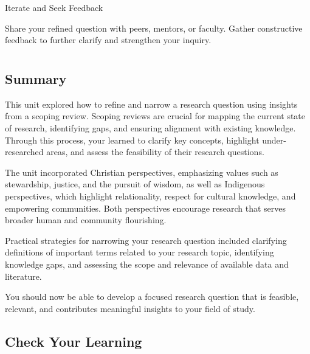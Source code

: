 \documentclass[
  letterpaper,
  DIV=11,
  numbers=noendperiod]{scrreprt}
\begin{document}
Iterate and Seek Feedback

Share your refined question with peers, mentors, or faculty. Gather
constructive feedback to further clarify and strengthen your inquiry.


\chapter*{}\label{section-8}

\markboth{}{}

\section*{Summary}\label{summary-4}


This unit explored how to refine and narrow a research question using
insights from a scoping review. Scoping reviews are crucial for mapping
the current state of research, identifying gaps, and ensuring alignment
with existing knowledge. Through this process, your learned to clarify
key concepts, highlight under-researched areas, and assess the
feasibility of their research questions.

The unit incorporated Christian perspectives, emphasizing values such as
stewardship, justice, and the pursuit of wisdom, as well as Indigenous
perspectives, which highlight relationality, respect for cultural
knowledge, and empowering communities. Both perspectives encourage
research that serves broader human and community flourishing.

Practical strategies for narrowing your research question included
clarifying definitions of important terms related to your research
topic, identifying knowledge gaps, and assessing the scope and relevance
of available data and literature.

You should now be able to develop a focused research question that is
feasible, relevant, and contributes meaningful insights to your field of
study.

\section*{Check Your Learning}\label{check-your-learning}

\end{document}
